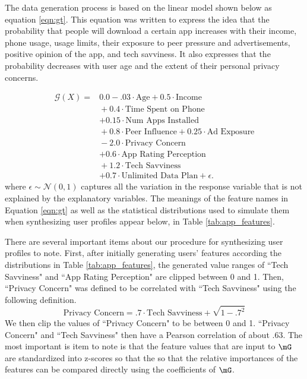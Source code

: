 \documentclass[11pt]{article}
\begin{document}
    The data generation process is based on the linear model shown below as equation \ref{eqn:gt}. This equation was written to express the idea that the probability that people will download a certain app increases with their income, phone usage, usage limits, their exposure to peer pressure and advertisements, positive opinion of the app, and tech savviness. It also expresses that the probability decreases with user age and the extent of their personal privacy concerns. 
    
\begin{equation}
\label{eqn:gt}
\begin{aligned}
\mathcal{G}(X) ={}& 0.0 - .03\cdot\text{Age}
+ 0.5\cdot\text{Income} \\
& {}+ 0.4\cdot\text{Time Spent on Phone}\\
&+ 0.15\cdot\text{Num Apps Installed} \\
& {}+ 0.8\cdot\text{Peer Influence}
+ 0.25\cdot\text{Ad Exposure} \\
& {}- 2.0\cdot\text{Privacy Concern}\\
&+ 0.6\cdot\text{App Rating Perception} \\
& {}+ 1.2\cdot\text{Tech Savviness}\\
&+ 0.7\cdot\text{Unlimited Data Plan}
+ \epsilon.
\end{aligned}
\end{equation}
    \noindent where $\epsilon \sim \mathcal{N}(0,1)$ captures all the variation in the response variable that is not explained by the explanatory variables. The meanings of the feature names in Equation \ref{eqn:gt} as well as the statistical distributions used to simulate them when synthesizing user profiles appear below, in Table \ref{tab:app_features}.
    
    
    There are several important items about our procedure for synthesizing user profiles to note. First, after initially generating users' features according the distributions in Table \ref{tab:app_features}, the generated value ranges of ``Tech Savviness" and ``App Rating Perception" are clipped between 0 and 1. Then, ``Privacy Concern" was defined to be correlated with ``Tech Savviness" using the following definition.
    \begin{equation*}
        \text{Privacy Concern} = .7 \cdot \text{Tech Savviness} + \sqrt{1-.7^2}
    \end{equation*}
    We then clip the values of ``Privacy Concern" to be between 0 and 1. ``Privacy Concern" and ``Tech Savviness" then have a Pearson correlation of about .63. The most important is item to note is that the feature values that are input to $\mG$ are standardized into z-scores so that the so that the relative importances of the features can be compared directly using the coefficients of $\mG$. 
    
\end{document}
